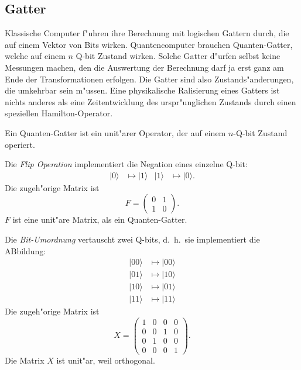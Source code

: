 \subsection{Gatter}
Klassische Computer f"uhren ihre Berechnung mit logischen Gattern durch,
die auf einem Vektor von Bits wirken.
Quantencomputer brauchen Quanten-Gatter, welche auf einem
$n$ Q-bit Zustand wirken.
Solche Gatter d"urfen selbst keine Messungen machen, den die
Auswertung der Berechnung darf ja erst ganz am Ende der
Transformationen erfolgen.
Die Gatter sind also Zustands"anderungen, die umkehrbar sein m"ussen.
Eine physikalische Ralisierung eines Gatters ist nichts anderes
als eine Zeitentwicklung des urspr"unglichen Zustands durch einen
speziellen Hamilton-Operator.

\begin{definition}
Ein Quanten-Gatter ist ein unit"arer Operator, der auf einem 
$n$-Q-bit Zustand operiert.
\end{definition}

\begin{beispiel}
Die {\em Flip Operation} implementiert die Negation eines einzelne Q-bit:
\begin{align*}
|0\rangle&\mapsto |1\rangle & |1\rangle&\mapsto |0\rangle.
\end{align*}
Die zugeh"orige Matrix ist
\[
F=\begin{pmatrix}
0&1\\
1&0
\end{pmatrix}.
\]
$F$ ist eine unit"are Matrix, als ein Quanten-Gatter.
\end{beispiel}

\begin{beispiel}
Die {\em Bit-Umordnung} vertauscht zwei Q-bits, d.~h.~sie implementiert
die ABbildung:
\begin{align*}
|00\rangle&\mapsto |00\rangle\\
|01\rangle&\mapsto |10\rangle\\
|10\rangle&\mapsto |01\rangle\\
|11\rangle&\mapsto |11\rangle
\end{align*}
Die zugeh"orige Matrix ist
\[
X=
\begin{pmatrix}
1&0&0&0\\
0&0&1&0\\
0&1&0&0\\
0&0&0&1
\end{pmatrix}.
\]
Die Matrix $X$ ist unit"ar, weil orthogonal.
\end{beispiel}

